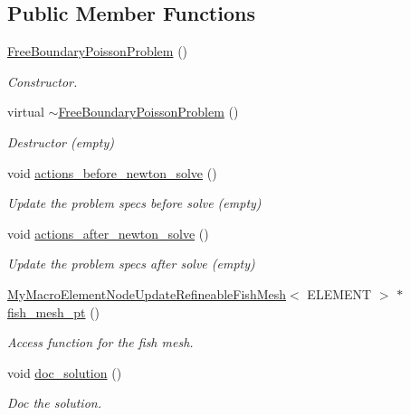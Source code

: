 \subsection*{Public Member Functions}
\begin{DoxyCompactItemize}
\item 
\hyperlink{classFreeBoundaryPoissonProblem_a0efe7c342eea790fc0240830bc3c4ebc}{Free\+Boundary\+Poisson\+Problem} ()
\begin{DoxyCompactList}\small\item\em Constructor. \end{DoxyCompactList}\item 
virtual \hyperlink{classFreeBoundaryPoissonProblem_a5b75b8553f3dfed4e9a8996c1b13edf3}{$\sim$\+Free\+Boundary\+Poisson\+Problem} ()
\begin{DoxyCompactList}\small\item\em Destructor (empty) \end{DoxyCompactList}\item 
void \hyperlink{classFreeBoundaryPoissonProblem_aeef57bd5dc79b6aba9eeadcd0c01a2e0}{actions\+\_\+before\+\_\+newton\+\_\+solve} ()
\begin{DoxyCompactList}\small\item\em Update the problem specs before solve (empty) \end{DoxyCompactList}\item 
void \hyperlink{classFreeBoundaryPoissonProblem_aa18df6c9a9287f67ae1bff0f67aaa625}{actions\+\_\+after\+\_\+newton\+\_\+solve} ()
\begin{DoxyCompactList}\small\item\em Update the problem specs after solve (empty) \end{DoxyCompactList}\item 
\hyperlink{classMyMacroElementNodeUpdateRefineableFishMesh}{My\+Macro\+Element\+Node\+Update\+Refineable\+Fish\+Mesh}$<$ E\+L\+E\+M\+E\+NT $>$ $\ast$ \hyperlink{classFreeBoundaryPoissonProblem_adccab51afed9228783120934b6be37c9}{fish\+\_\+mesh\+\_\+pt} ()
\begin{DoxyCompactList}\small\item\em Access function for the fish mesh. \end{DoxyCompactList}\item 
void \hyperlink{classFreeBoundaryPoissonProblem_a2282d8ac1d5753771a9a3cfc0417f6b6}{doc\+\_\+solution} ()
\begin{DoxyCompactList}\small\item\em Doc the solution. \end{DoxyCompactList}\item 

\end{DoxyCompactItemize}
